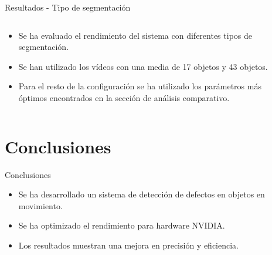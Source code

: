 \documentclass[spanish]{beamer}
\begin{document}
\begin{frame}{Resultados - Tipo de segmentación}
    \begin{columns}
        \begin{column}{0.5\textwidth}
            \begin{itemize}
                \item Se ha evaluado el rendimiento del sistema con diferentes tipos de segmentación.
                \item Se han utilizado los vídeos con una media de 17 objetos y 43 objetos.
                \item Para el resto de la configuración se ha utilizado los parámetros más óptimos encontrados en la sección de análisis comparativo.
            \end{itemize}
        \end{column}
        \begin{column}{0.5\textwidth}

        \end{column}
    \end{columns}
\end{frame}

\section{Conclusiones}
\begin{frame}{Conclusiones}
    \begin{itemize}
        \item Se ha desarrollado un sistema de detección de defectos en objetos en movimiento.
        \item Se ha optimizado el rendimiento para hardware NVIDIA.
        \item Los resultados muestran una mejora en precisión y eficiencia.
    \end{itemize}
\end{frame}
\end{document}
